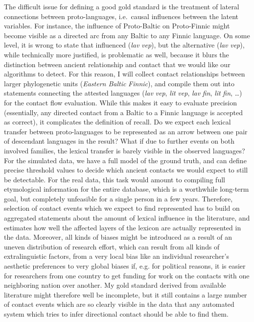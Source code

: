 The difficult issue for defining a good gold standard is the treatment of lateral connections between proto-languages, i.e.\ causal influences between the latent variables. For instance, the influence of Proto-Baltic on Proto-Finnic might become visible as a directed arc from any Baltic to any Finnic language. On some level, it is wrong to state that  influenced  (\textit{lav} \arrowLA \textit{vep}), but the alternative (\textit{lav} \arrowAA \textit{vep}), while technically more justified, is problematic as well, because it blurs the distinction between ancient relationship and contact that we would like our algorithms to detect. For this reason, I will collect contact relationships between larger phylogenetic units (\textit{Eastern Baltic} \arrowLA \textit{Finnic}), and compile them out into statements connecting the attested languages (\textit{lav} \arrowLA \textit{vep}, \textit{lit} \arrowLA \textit{vep}, \textit{lav} \arrowLA \textit{fin}, 
\textit{lit} \arrowLA \textit{fin}, \dots) for the contact flow evaluation. While this makes it easy to evaluate precision (essentially, any directed contact from a Baltic to a Finnic language is accepted as correct), it complicates the definition of recall. Do we expect each lexical transfer between proto-languages to be represented as an arrow between one pair of descendant languages in the result? What if due to further events on both involved families, the lexical transfer is barely visible in the observed languages? For the simulated data, we have a full model of the ground truth, and can define precise threshold values to decide which ancient contacts we would expect to still be detectable. For the real data, this task would amount to compiling full etymological information for the entire database, which is a worthwhile long-term goal, but completely unfeasible for a single person in a few years. Therefore, selection of contact events which we expect to find represented has to build on aggregated 
statements about the amount of lexical influence in the literature, and estimates how well the affected layers of the lexicon are actually represented in the data. Moreover, all kinds of biases might be introduced as a result of an uneven distribution of research effort, which can result from all kinds of extralinguistic factors, from a very local bias like an individual researcher's aesthetic preferences to very global biases if, e.g. for political reasons, it is easier for researchers from one country to get funding for work on the contacts with one neighboring nation over another. My gold standard derived from available literature might therefore well be incomplete, but it still contains a large number of contact events which are so clearly visible in the data that any automated system which tries to infer directional contact should be able to find them.

